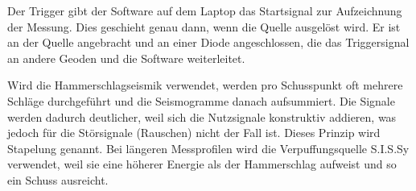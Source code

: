 Der Trigger gibt der Software auf dem Laptop das Startsignal zur Aufzeichnung der Messung. Dies geschieht genau dann, wenn die Quelle ausgelöst wird. Er ist an der Quelle angebracht und an einer Diode angeschlossen, die das Triggersignal an andere Geoden und die Software weiterleitet.  

Wird die Hammerschlagseismik verwendet, werden pro Schusspunkt oft mehrere Schläge durchgeführt und die Seismogramme danach aufsummiert. Die Signale werden dadurch deutlicher, weil sich die Nutzsignale konstruktiv addieren, was jedoch für die Störsignale (Rauschen) nicht der Fall ist. Dieses Prinzip wird Stapelung genannt. Bei längeren Messprofilen wird die Verpuffungsquelle S.I.S.Sy verwendet, weil sie eine höherer Energie als der Hammerschlag aufweist und so ein Schuss ausreicht.

